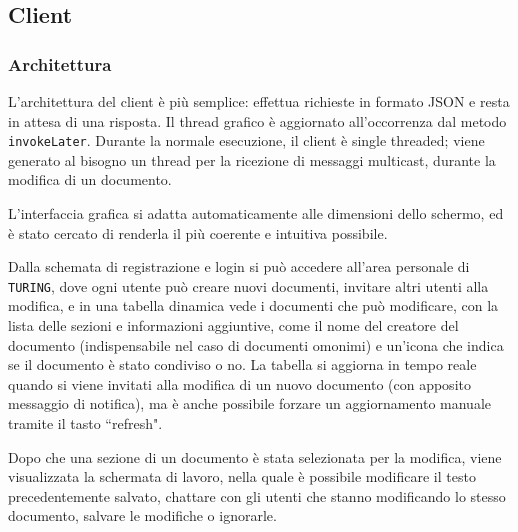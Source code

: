 \subsection{Client}

\subsubsection{Architettura}
L'architettura del client è più semplice: effettua richieste in formato JSON e resta in attesa di una risposta. Il thread grafico è aggiornato all'occorrenza dal metodo \texttt{invokeLater}. Durante la normale esecuzione, il client è single threaded; viene generato al bisogno un thread per la ricezione di messaggi multicast, durante la modifica di un documento.

\medskip

L'interfaccia grafica si adatta automaticamente alle dimensioni dello scher\-mo, ed è stato cercato di renderla il più coerente e intuitiva possibile.

\medskip

Dalla schemata di registrazione e login si può accedere all'area personale di \texttt{TURING}, dove ogni utente può creare nuovi documenti, invitare altri utenti alla modifica, e in una tabella dinamica vede i documenti che può modificare, con la lista delle sezioni e informazioni aggiuntive, come il nome del creatore del documento (indispensabile nel caso di documenti omonimi) e un'icona che indica se il documento è stato condiviso o no. La tabella si aggiorna in tempo reale quando si viene invitati alla modifica di un nuovo documento (con apposito messaggio di notifica), ma è anche possibile forzare un aggiornamento manuale tramite il tasto ``refresh".

\medskip

Dopo che una sezione di un documento è stata selezionata per la modifica, viene visualizzata la schermata di lavoro, nella quale è possibile modificare il testo precedentemente salvato, chattare con gli utenti che stanno modificando lo stesso documento, salvare le modifiche o ignorarle.
